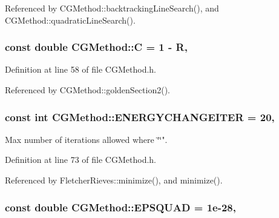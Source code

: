 Referenced by C\+G\+Method\+::backtracking\+Line\+Search(), and C\+G\+Method\+::quadratic\+Line\+Search().

\hypertarget{classCGMethod_af8587ca1c0394c244ce84fe8a6ad29ff}{
\subsubsection[{C}]{\setlength{\rightskip}{0pt plus 5cm}const double C\+G\+Method\+::\+C = 1 -\/ {\bf R}\hspace{0.3cm}{\ttfamily [protected]}, {\ttfamily [inherited]}}}\label{classCGMethod_af8587ca1c0394c244ce84fe8a6ad29ff}


Definition at line 58 of file C\+G\+Method.\+h.



Referenced by C\+G\+Method\+::golden\+Section2().

\hypertarget{classCGMethod_aaee1e11813855cc66c360f7cb3d9665a}{
\subsubsection[{E\+N\+E\+R\+G\+Y\+C\+H\+A\+N\+G\+E\+I\+T\+E\+R}]{\setlength{\rightskip}{0pt plus 5cm}const int C\+G\+Method\+::\+E\+N\+E\+R\+G\+Y\+C\+H\+A\+N\+G\+E\+I\+T\+E\+R = 20\hspace{0.3cm}{\ttfamily [protected]}, {\ttfamily [inherited]}}}\label{classCGMethod_aaee1e11813855cc66c360f7cb3d9665a}


Max number of iterations allowed where \char`\"{}\char`\"{}". 



Definition at line 73 of file C\+G\+Method.\+h.



Referenced by Fletcher\+Rieves\+::minimize(), and minimize().

\hypertarget{classCGMethod_adb2a688fe52a8729d703d81e52b9fdb3}{
\subsubsection[{E\+P\+S\+Q\+U\+A\+D}]{\setlength{\rightskip}{0pt plus 5cm}const double C\+G\+Method\+::\+E\+P\+S\+Q\+U\+A\+D = 1e-\/28\hspace{0.3cm}{\ttfamily [protected]}, {\ttfamily [inherited]}}}\label{classCGMethod_adb2a688fe52a8729d703d81e52b9fdb3}


